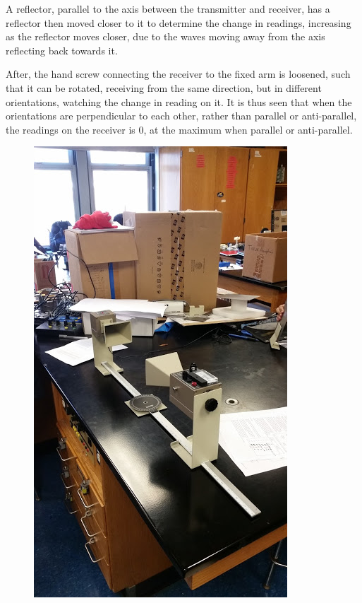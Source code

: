\documentclass[11pt, titlepage]{article}
\begin{document}
A reflector, parallel to the axis between the transmitter and receiver, has a reflector then moved closer to it to determine the change in readings, increasing as the reflector moves closer, due to the waves moving away from the axis reflecting back towards it.

After, the hand screw connecting the receiver to the fixed arm is loosened, such that it can be rotated, receiving from the same direction, but in different orientations, watching the change in reading on it. It is thus seen that when the orientations are perpendicular to each other, rather than parallel or anti-parallel, the readings on the receiver is 0, at the maximum when parallel or anti-parallel.



\begin{figure}[h]
\centering
\hspace*{0cm}
\includegraphics[scale=1]{lab61.jpg}
\vspace*{0cm}
\end{figure}
\end{document}
